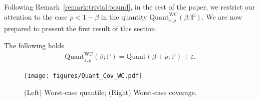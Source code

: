 \documentclass[11pt,a4paper]{article}
\begin{document}
Following Remark~\ref{remark:trivial:bound}, in the rest of the paper, we restrict our attention to the case $\rho < 1 - \beta$ in the quantity $\text{Quant}_{\varepsilon,\rho}^{\text{WC}}(\beta;\mathbb P)$. We are now prepared to present the first result of this section.

\begin{proposition}
\label{prop:WC:Quant}
The following holds
\begin{align}
\label{eq:WC:Quant}
    \text{Quant}_{\varepsilon,\rho}^{\text{WC}}(\beta;\mathbb P) = \text{Quant}(\beta+\rho; \mathbb P) + \varepsilon.
\end{align}
\end{proposition}
\begin{figure}[t]
    \centering
    \texttt{[image: figures/Quant\_Cov\_WC.pdf]}
    \caption{(Left) Worst-case quantile; (Right) Worst-case coverage.}
    \label{fig:Quant_Cov}
\end{figure}
\end{document}
